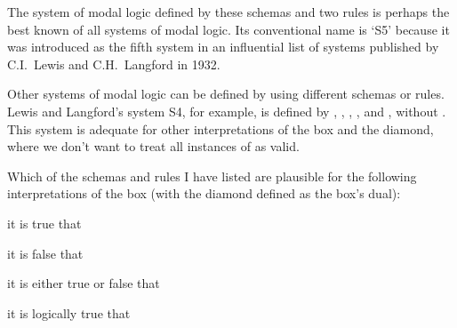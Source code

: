 The system of modal logic defined by these schemas and two rules is perhaps the
best known of all systems of modal logic. Its conventional name is `S5' because
it was introduced as the fifth system in an influential list of systems
published by C.I.\ Lewis and C.H.\ Langford in 1932.

Other systems of modal logic can be defined by using different schemas or rules.
Lewis and Langford's system S4, for example, is defined by ,
, , ,  and , without
. This system is adequate for other interpretations of the box and the
diamond, where we don't want to treat all instances of  as valid.

\begin{exercise}
  Which of the schemas and rules I have listed are plausible for the following
  interpretations of the box (with the diamond defined as the box's dual):
  \begin{exlist}
    \item it is true that
    \item it is false that
    \item it is either true or false that
    \item it is logically true that
  \end{exlist}
\end{exercise}
